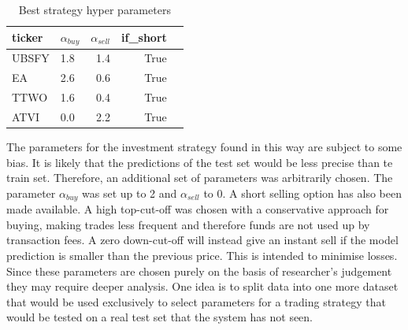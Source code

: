 \documentclass[11pt]{article} %
\begin{document}
\begin{table}[H]
\centering
\caption{Best strategy hyper parameters}
\begin{tabular}{llrrl}
\toprule
 ticker &  $\alpha_{buy}$ &  $\alpha_{sell}$  &  if\_short \\
\midrule
  UBSFY &          1.8 &           1.4 &      True \\
     EA &          2.6 &           0.6 &      True \\
   TTWO &          1.6 &           0.4 &      True \\
   ATVI &          0.0 &           2.2 &      True \\
\bottomrule
\end{tabular}
\end{table}


The parameters for the investment strategy found in this way are subject to some bias. It is likely that the predictions of the test set would be less precise than te train set. Therefore, an additional set of parameters was arbitrarily chosen. The parameter $\alpha_{buy}$  was set up to 2 and $\alpha_{sell}$  to 0. A short selling option has also been made available.  A high top-cut-off was chosen with a conservative approach for buying, making trades less frequent and therefore funds are not used up by transaction fees. A zero down-cut-off will instead give an instant sell if the model prediction is smaller than the previous price. This is intended to minimise losses. Since these parameters are chosen purely on the basis of researcher's judgement they may require deeper analysis. One idea is to split data into one more dataset that would be used exclusively to select parameters for a trading strategy that would be tested on a real test set that the system has not seen. 
\end{document}
